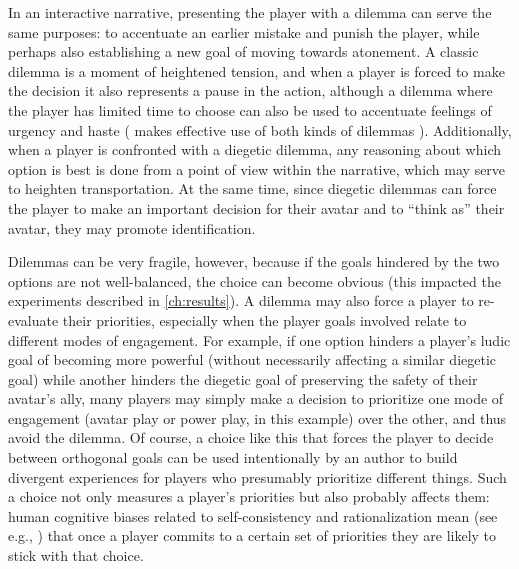 In an interactive narrative, presenting the player with a dilemma can serve the same purposes: to accentuate an earlier mistake and punish the player, while perhaps also establishing a new goal of moving towards atonement.
%
A classic dilemma is a moment of heightened tension, and when a player is forced to make the decision it also represents a pause in the action, although a dilemma where the player has limited time to choose can also be used to accentuate feelings of urgency and haste ( makes effective use of both kinds of dilemmas \citep{TheWalkingDead}).
%
Additionally, when a player is confronted with a diegetic dilemma, any reasoning about which option is best is done from a point of view within the narrative, which may serve to heighten transportation.
%
At the same time, since diegetic dilemmas can force the player to make an important decision for their avatar and to ``think as'' their avatar, they may promote identification.


Dilemmas can be very fragile, however, because if the goals hindered by the two options are not well-balanced, the choice can become obvious (this impacted the experiments described in \cref{ch:results}).
%
A dilemma may also force a player to re-evaluate their priorities, especially when the player goals involved relate to different modes of engagement.
%
For example, if one option hinders a player's ludic goal of becoming more powerful (without necessarily affecting a similar diegetic goal) while another hinders the diegetic goal of preserving the safety of their avatar's ally, many players may simply make a decision to prioritize one mode of engagement (avatar play or power play, in this example) over the other, and thus avoid the dilemma.
%
Of course, a choice like this that forces the player to decide between orthogonal goals can be used intentionally by an author to build divergent experiences for players who presumably prioritize different things.
%
Such a choice not only measures a player's priorities but also probably affects them: human cognitive biases related to self-consistency and rationalization mean (see e.g., \citep{Hall2012}) that once a player commits to a certain set of priorities they are likely to stick with that choice.



